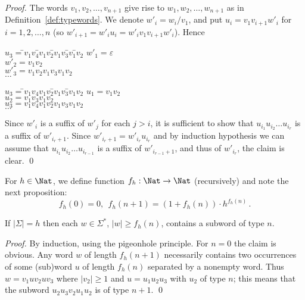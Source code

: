 \documentclass[12pt]{article}
\begin{document}
\begin{proof}
The words $v_1,v_2,\dots,v_{n+1}$ give rise to $w_1,w_2,\dots,w_{n+1}$ as
in Definition~\ref{def:typewords}. We  denote $w'_i=w_i/v_1$, 
and put $u_i=v_1v_{i+1}w'_i$ for $i=1,2,\dots,n$
(so $w'_{i+1}=w'_iu_i=w'_iv_1v_{i+1}w'_i$). 
Hence

\begin{minipage}{0.3\textwidth}
\begin{tabbing}
$u_3=$\=$v_1v_4$\=$v_1v_2$\=$v_1v_3$\=$v_1$\=$v_2$\kill
$w'_1=$\>\>\>\>\>$\varepsilon$\\
$w'_2=$\>\>\>\>$v_1v_2$\\
$w'_3=$\>\>$v_1v_2v_1v_3v_1v_2$\\
$\dots$
\end{tabbing}
\end{minipage}
\hspace{1em}
\begin{minipage}{0.3\textwidth}
\begin{tabbing}
$u_3=$\=$v_1v_4v_1v_2$\=$v_1v_3$\=$v_1v_2$\kill
$u_1=$\>\>\>$v_1v_2$\\
$u_2=$\>\>$v_1v_3v_1v_2$\\
$u_3=$\>$v_1v_4v_1v_2v_1v_3v_1v_2$\\
$\dots$
\end{tabbing}
\end{minipage}

\noindent
Since $w'_i$ is a suffix of $w'_j$ for each $j>i$, it is sufficient to
show that 
$u_{i_1}u_{i_2}\dots u_{i_r}$ is a suffix of
$w'_{i_r+1}$.
Since $w'_{i_r+1}=w'_{i_r}u_{i_r}$ and by induction hypothesis we can
assume that
$u_{i_1}u_{i_2}\dots u_{i_{r-1}}$ 
is a suffix of $w'_{i_{r-1}+1}$, and thus of $w'_{i_r}$, the claim is
clear.
\qed
\end{proof}



\noindent
For $h\in\Nat$, we define  function $f_h:\Nat\rightarrow\Nat$
(recursively) 
and note the next proposition:
\[ f_h(0)=0,\ \  f_h(n+1)=(1+f_h(n))\cdot h^{f_h(n)}\,. \]

\begin{prop}\label{prop:longword}
If $|\Sigma|=h$ then 
each $w\in \Sigma^*$, $|w|\geq f_h(n)$, 
contains a subword of type $n$.
\end{prop}

\begin{proof}
By induction, using the pigeonhole
principle. For $n=0$ the claim is obvious.
Any word $w$ of
length $f_h(n+1)$ necessarily 
contains two occurrences of some
(sub)word $u$ of length $f_h(n)$ separated by a nonempty word. 
Thus $w=v_1uv_2uv_3$ where  $|v_2|\geq 1$ and 
$u=u_1u_2u_3$ with  $u_2$ of type $n$; 
this means that the subword
$u_2u_3v_2u_1u_2$ is of type $n+1$.
\qed
\end{proof}
\end{document}
